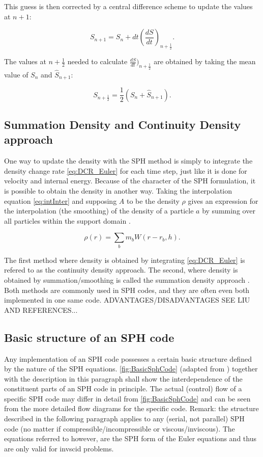 \documentclass{report}
\begin{document}
This guess is then corrected by a central difference scheme to update the values at
$n+1$:

\begin{equation}
S_{n+1}=S_n+dt\left(\frac{dS}{dt}\right)_{n+\frac{1}{2}}.
\end{equation}

The values at $n+\frac{1}{2}$ needed to calculate
$\frac{dS}{dt})_{n+\frac{1}{2}}$ are obtained by taking the mean value of
$S_n$ and $\hat S_{n+1}$:

\begin{equation}
S_{n+\frac{1}{2}}=\frac{1}{2}(S_n+\hat S_{n+1}).
\end{equation}

\subsection{Summation Density and Continuity Density approach}
\label{sec:DensCalcMode}
One way to update the density with the SPH method is simply to integrate the density 
change rate \ref{eq:DCR_Euler} for each time step, just like it is done for velocity 
and internal energy. Because of the character of the SPH formulation, it is  
possible to obtain the density in another way. Taking the interpolation equation 
\ref{eq:intInter} and supposing $A$ to be the density $\rho$ gives an expression for 
the interpolation (the smoothing) of the density of a particle $a$ by summing over 
all particles within the support domain \cite{Monaghan2005}.

\begin{equation}
\label{eq:SumDensity}
\rho(r)=\sum_b m_b W(r-r_b,h).
\end{equation}

The first method where density is obtained by integrating \ref{eq:DCR_Euler} is refered 
to as the continuity density approach. The second, where density is obtained by 
summation/smoothing is called the summation density approach \cite{Liu2003}. 
Both methods are commonly used in SPH codes, and they are often even both implemented 
in one same code. ADVANTAGES/DISADVANTAGES SEE LIU AND REFERENCES...

\subsection{Basic structure of an SPH code}

Any implementation of an SPH code possesses a certain basic structure defined by the 
nature of the SPH equations. \ref{fig:BasicSphCode} (adapted from \cite{Liu2003}) 
together with the description in this paragraph shall show the interdependence of the 
constituent parts of an SPH code in principle. The actual (control) flow of a specific
SPH code may differ in detail from \ref{fig:BasicSphCode} and can be seen 
from the more detailed flow diagrams for the specific code.
Remark: the structure described in the following paragraph applies to any (serial, not parallel) SPH code (no matter if compressible/incompressible or viscous/inviscous). The equations referred to however, are the SPH form of the Euler equations and thus are only valid for invscid problems.
\end{document}
